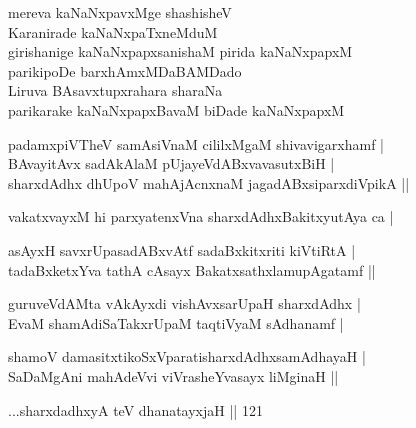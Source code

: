 \begin{entry}
\gl{}
\begin{shl}
mereva kaNaNxpavxMge shashisheV\\
Karanirade kaNaNxpaTxneMduM\\
girishanige kaNaNxpapxsanishaM pirida kaNaNxpapxM\\
parikipoDe barxhAmxMDaBAMDado\\
Liruva BAsavxtupxrahara sharaNa\\
parikarake kaNaNxpapxBavaM biDade kaNaNxpapxM
\end{shl}
\end{entry}

\begin{entry}
\end{entry}

\begin{entry}
\begin{shl}
padamxpiVTheV samAsiVnaM cililxMgaM shivavigarxhamf |\\
BAvayitAvx sadAkAlaM pUjayeVdABxvavasutxBiH |\\
sharxdAdhx dhUpoV mahAjAcnxnaM jagadABxsiparxdiVpikA ||
\end{shl}
\begin{shl}
vakatxvayxM hi parxyatenxVna sharxdAdhxBakitxyutAya ca |
\end{shl}
\begin{shl}
asAyxH savxrUpasadABxvAtf sadaBxkitxriti kiVtiRtA |\\
tadaBxketxYva tathA cAsayx BakatxsathxlamupAgatamf ||
\end{shl}
\begin{shl}
guruveVdAMta vAkAyxdi vishAvxsarUpaH sharxdAdhx |\\
EvaM shamAdiSaTakxrUpaM taqtiVyaM sAdhanamf |
\end{shl}
\begin{shl}
shamoV damasitxtikoSxVparatisharxdAdhxsamAdhayaH |\\
SaDaMgAni mahAdeVvi viVrasheYvasayx liMginaH ||
\end{shl}
\gl{}
\info{}{}{}{}
\begin{shl}
...sharxdadhxyA teV dhanatayxjaH || 121
\end{shl}

\gl{}
\end{entry}

